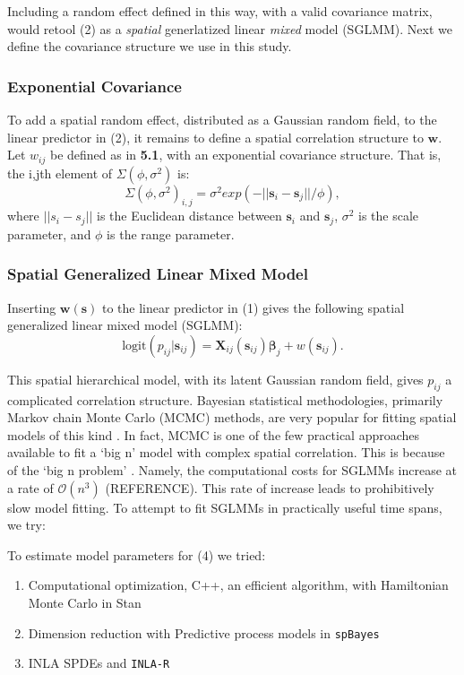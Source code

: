 \documentclass{article}
\begin{document}
Including a random effect defined in this way, with a valid covariance matrix, would retool (2) as a {\it spatial} generlatized linear {\it mixed} model (SGLMM). Next we define the covariance structure we use in this study.

\subsubsection{Exponential Covariance}
To add a spatial random effect, distributed as a Gaussian random field, to the linear predictor in (2), it remains to define a spatial correlation structure to $\pmb{w}$. Let $w_{ij}$ be defined as in {\bf 5.1}, with an exponential covariance structure. That is, the i,jth element of $\Sigma(\phi, \sigma^{2})$ is:
\begin{equation}
\Sigma(\phi, \sigma^{2})_{i,j} = \sigma^{2} exp(-||\pmb{s}_{i} - \pmb{s}_{j}||/\phi),
\end{equation}
where $||s_{i} - s_{j}||$ is the Euclidean distance between $\pmb{s}_{i}$ and $\pmb{s}_{j}$, $\sigma^{2}$ is the scale parameter, and $\phi$ is the range parameter.

\subsubsection{Spatial Generalized Linear Mixed Model}
Inserting $\pmb{w}(\pmb{s})$ to the linear predictor in (1) gives the following spatial generalized linear mixed model (SGLMM):
\begin{equation}
\text{logit}(p_{ij}|\pmb{s}_{ij}) = \pmb{X}_{ij}(\pmb{s}_{ij}) \pmb{\beta}_{j} + w(\pmb{s}_{ij}).
\end{equation}

This spatial hierarchical model, with its latent Gaussian random field, gives $p_{ij}$ a complicated correlation structure. Bayesian statistical methodologies, primarily Markov chain Monte Carlo (MCMC) methods, are very popular for fitting spatial models of this kind \citep{Banerjee2014}. In fact, MCMC is one of the few practical approaches available to fit a `big n' model with complex spatial correlation. This is because of the `big n problem' \citep{Lindgren2011}. Namely, the computational costs for SGLMMs increase at a rate of $\mathcal{O}(n^{3})$ (REFERENCE). This rate of increase leads to prohibitively slow model fitting. To attempt to fit SGLMMs in practically useful time spans, we try: 

To estimate model parameters for (4) we tried:
\begin{enumerate}
\item Computational optimization, C++, an efficient algorithm, with Hamiltonian Monte Carlo in Stan
\item Dimension reduction with Predictive process models in \verb|spBayes|
\item INLA SPDEs and \verb|INLA-R|
\end{enumerate}
\end{document}
